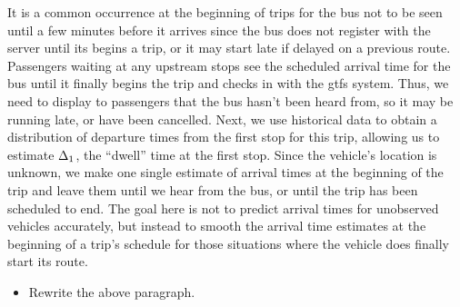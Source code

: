 It is a common occurrence at the beginning of trips for the bus not to be seen until a few minutes before it arrives since the bus does not register with the server until its begins a trip, or it may start late if delayed on a previous route. Passengers waiting at any upstream stops see the scheduled arrival time for the bus until it finally begins the trip and checks in with the \gls{gtfs} system. Thus, we need to display to passengers that the bus hasn't been heard from, so it may be running late,  or have been cancelled. Next, we use historical data to obtain a distribution of departure times from the first stop for this trip, allowing us to estimate $\Delta_{1}$, the ``dwell'' time at the first stop. Since the vehicle's location is unknown, we make one single estimate of arrival times at the beginning of the trip and leave them until we hear from the bus, or until the trip has been scheduled to end. The goal here is not to predict arrival times for unobserved vehicles accurately, but instead to smooth the arrival time estimates at the beginning of a trip's schedule for those situations where the vehicle does finally start its route.

\begin{itemize}
\item Rewrite the above paragraph.
\end{itemize}
